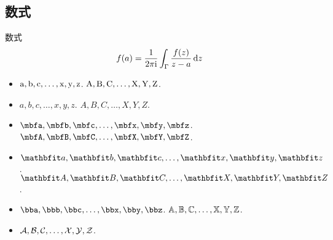 \documentclass[12pt,unicode]{beamer}
\begin{document}
  \subsection{数式}
  \begin{frame}{数式}
    \begin{align}
      f(a) = \frac{1}{2\pi\mathrm{i}} \int_\Gamma \frac{f(z)}{z-a} \dd{z}
    \end{align}
    \begin{itemize}
      \item $\mathrm{a},\mathrm{b},\mathrm{c},\dots,\mathrm{x},\mathrm{y},\mathrm{z}$. $\mathrm{A},\mathrm{B},\mathrm{C},\dots,\mathrm{X},\mathrm{Y},\mathrm{Z}$.
      \item $a,b,c,\dots,x,y,z$. $A,B,C,\dots,X,Y,Z$.
      \item $\bfa,\bfb,\bfc,\dots,\bfx,\bfy,\bfz$. $\bfA,\bfB,\bfC,\dots,\bfX,\bfY,\bfZ$.
      \item $\bma,\bmb,\bmc,\dots,\bmx,\bmy,\bmz$. $\bmA,\bmB,\bmC,\dots,\bmX,\bmY,\bmZ$.
      \item $\bba,\bbb,\bbc,\dots,\bbx,\bby,\bbz$. $\mathbb{A},\mathbb{B},\mathbb{C},\dots,\mathbb{X},\mathbb{Y},\mathbb{Z}$.
      \item $\mathcal{A},\mathcal{B},\mathcal{C},\dots,\mathcal{X},\mathcal{Y},\mathcal{Z}$.
    \end{itemize}
  \end{frame}
\end{document}
